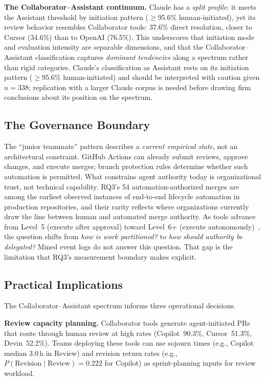 \documentclass[sigconf]{acmart}
\begin{document}
\textbf{The Collaborator--Assistant continuum.}
Claude has a \emph{split profile}: it meets the Assistant
threshold by initiation pattern ($\geq$95.6\% human-initiated),
yet its review behavior resembles Collaborator tools:
37.6\% direct resolution, closer to Cursor (34.6\%) than to
OpenAI (76.5\%).
This underscores that initiation mode and evaluation intensity
are separable dimensions, and that the Collaborator--Assistant
classification captures \emph{dominant tendencies} along a
spectrum rather than rigid categories.
Claude's classification as Assistant rests on its initiation
pattern ($\geq$95.6\% human-initiated) and should be interpreted
with caution given $n = 338$; replication with a larger Claude
corpus is needed before drawing firm conclusions about its
position on the spectrum.

\subsection{The Governance Boundary}

The ``junior teammate'' pattern describes a \emph{current
empirical state}, not an architectural constraint.
GitHub Actions can already submit reviews, approve changes, and
execute merges; branch protection rules determine whether such
automation is permitted.
What constrains agent authority today is organizational trust,
not technical capability.
RQ3's 54 automation-authorized merges are among the earliest
observed instances of end-to-end lifecycle automation in production
repositories, and their rarity reflects where organizations
currently draw the line between human and automated merge
authority.
As tools advance from Level~5 (execute after approval) toward
Level~6+ (execute autonomously)~\cite{sheridan1978human}, the
question shifts from \emph{how is work partitioned?} to
\emph{how should authority be delegated?}
Mined event logs do not answer this question. That gap is
the limitation that RQ3's measurement boundary makes explicit.

\subsection{Practical Implications}

The Collaborator--Assistant spectrum informs three operational
decisions.

\textbf{Review capacity planning.}
Collaborator tools generate agent-initiated PRs that route through
human review at high rates (Copilot~90.3\%, Cursor~51.3\%,
Devin~52.2\%).
Teams deploying these tools can use sojourn times (e.g.,
Copilot median 3.0\,h in Review) and revision return rates
(e.g., $P(\text{Revision} \mid \text{Review}) = 0.222$ for
Copilot) as sprint-planning inputs for review workload.
\end{document}

